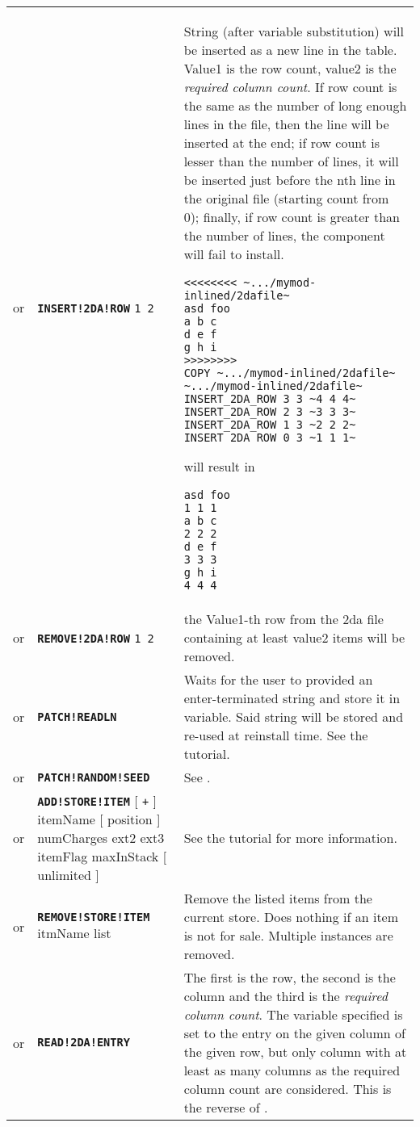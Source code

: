 \documentclass{article}
\def\ttref#1{\ahrefloc{#1}{\tt #1}}
\def\DEFINE#1{{\tt \bf #1}\label{#1}\index{#1}}
\def\DEFSYN#1{{\tt \bf #1}\index{#1}}
\def\t#1{{\tt #1}}
\def\Slist{{\color{red} list }}
\def\Ob{{\color{red} [ }}
\def\Oe{{\color{red} ] }}
\begin{document}
\begin{tabular}{cp{10in}|p{10in}}
or & \DEFINE{INSERT!2DA!ROW} \t{\ttref{value}1 \ttref{value}2 \ttref{String}} &
  String (after variable substitution) will be inserted as a new line in the table.
  Value1 is the row count, value2 is the \emph{required column count}. If row count is
  the same as the number of long enough lines in the file, then the line will be inserted
  at the end; if row count is lesser than the number of lines, it will be inserted just before
  the nth line in the original file (starting count from 0); finally, if row count is greater
  than the number of lines, the component will fail to install.
\begin{verbatim}
<<<<<<<< ~.../mymod-inlined/2dafile~
asd foo
a b c
d e f
g h i
>>>>>>>>
COPY ~.../mymod-inlined/2dafile~ ~.../mymod-inlined/2dafile~
INSERT_2DA_ROW 3 3 ~4 4 4~
INSERT_2DA_ROW 2 3 ~3 3 3~
INSERT_2DA_ROW 1 3 ~2 2 2~
INSERT_2DA_ROW 0 3 ~1 1 1~
\end{verbatim}
will result in
\begin{verbatim}
asd foo
1 1 1
a b c
2 2 2
d e f
3 3 3
g h i
4 4 4
\end{verbatim} \\
or & \DEFINE{REMOVE!2DA!ROW} \t{\ttref{value}1 \ttref{value}2} &
  the Value1-th row from the 2da file containing at least value2 items will be removed.
\\
or & \DEFINE{PATCH!READLN} \ttref{variable} &
  Waits for the user to provided an enter-terminated string and store it in
  variable. Said string will be stored and re-used at reinstall time. See the
  \ttref{READLN} tutorial. \\
or & \DEFINE{PATCH!RANDOM!SEED} \ttref{value} &
  See \ttref{RANDOM!SEED}. \\
or & \DEFSYN{ADD!STORE!ITEM} \Ob \t{+} \Oe itemName \Ob position \Oe
  numCharges ext2 ext3 itemFlag maxInStack \Ob unlimited \Oe &
  See the \ttref{ADD!STORE!ITEM} tutorial for more information.
 \\
or & \DEFINE{REMOVE!STORE!ITEM} itmName \Slist &
  Remove the listed items from the current store. Does nothing if an item is not for sale.
	Multiple instances are removed. \\
or & \DEFINE{READ!2DA!ENTRY} \ttref{value} \ttref{value} \ttref{value}
\ttref{variable} &
  The first \ttref{value} is the row, the second is the column and the
  third is the \emph{required column count}. The variable specified is set
  to the entry on the given column of the given row, but only column
  with at least as many columns as the required column count are
  considered. This is the reverse of \ttref{SET!2DA!ENTRY}. \\

\end{tabular}
\end{document}
